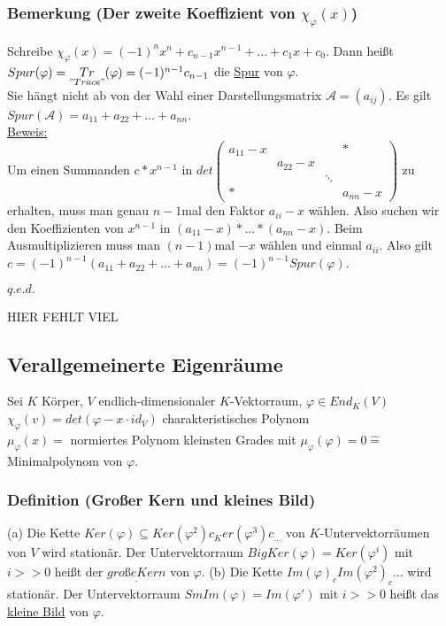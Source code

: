 \documentclass[a4paper]{article}
\newcommand{\ul}{\underline}
\renewcommand{\qed}{\begin{flushright}
\ul{\(q.e.d.\)}
\end{flushright}}
\let\phi\varphi
\begin{document}
\subsubsection{Bemerkung (Der zweite Koeffizient von \(\chi_\phi(x)\))}
Schreibe \(\chi_\phi(x)=(-1)^nx^n+c_{n-1}x^{n-1}+\dots+c_1x+c_0\). Dann heißt \(Spur(\phi)=\underset{"Trace"}{Tr}(\phi)=(-1)^{n-1}c_{n-1}\) die \ul{Spur} von \(\phi\).\\
Sie hängt nicht ab von der Wahl einer Darstellungsmatrix \(\mathcal{A}=(a_{ij})\). Es gilt \(Spur(\mathcal{A})=a_{11}+a_{22}+\dots+a_{nn}\).\\
\ul{Beweis:}\\
Um einen Summanden \(c*x^{n-1}\) in \(det\begin{pmatrix}
a_{11}-x & & & * \\
 & a_{22}-x & & \\
 & & \ddots & \\
* & & & a_{nn}-x
\end{pmatrix}\) zu erhalten, muss man genau \(n-1\)mal den Faktor \(a_{ii}-x\) wählen. Also suchen wir den Koeffizienten von \(x^{n-1}\) in \((a_{11}-x)*\dots*(a_{nn}-x)\). Beim Ausmultiplizieren muss man \((n-1)\)mal \(-x\) wählen und einmal \(a_{ii}\). Also gilt \(c=(-1)^{n-1}(a_{11}+a_{22}+\dots+a_{nn})=(-1)^{n-1} Spur(\phi)\).
\qed
HIER FEHLT VIEL
\setcounter{subsection}{21}
\subsection{Verallgemeinerte Eigenräume}
Sei \(K\) Körper, \(V\) endlich-dimensionaler \(K\)-Vektorraum, \(\phi \in End_K(V)\)\\
\(\chi_\phi(v)=det(\phi-x\cdot id_V)\) charakteristisches Polynom\\
\(\mu_\phi(x)=\) normiertes Polynom kleinsten Grades mit \(\mu_\phi (\phi) = 0 \hat{=}\) Minimalpolynom von \(\phi\).
\subsubsection{Definition (Großer Kern und kleines Bild)}
(a) Die Kette \(Ker(\phi) \subseteq Ker(\phi^2) c_ Ker(\phi^3) c_ \dots\) von \(K\)-Untervektorräumen von \(V\) wird stationär. Der Untervektorraum \(BigKer(\phi)=Ker(\phi^i)\) mit \(i >> 0\) heißt der \(\ul{große Kern}\) von \(\phi\).
(b) Die Kette \(Im(\phi) _c Im(\phi^2) _c \dots\) wird stationär. Der Untervektorraum \(SmIm(\phi) = Im(\phi')\) mit \(i >> 0\) heißt das \ul{kleine Bild} von \(\phi\).
\end{document}
